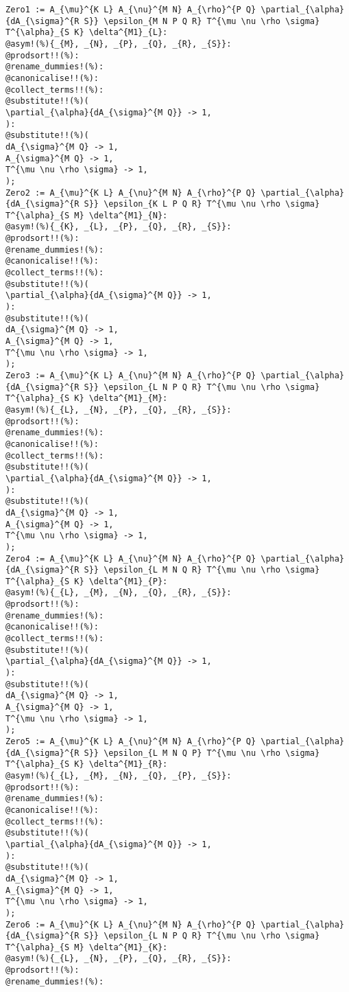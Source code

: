 \documentclass[11pt]{article}
\begin{document}
{\color[named]{Blue}\begin{verbatim}
Zero1 := A_{\mu}^{K L} A_{\nu}^{M N} A_{\rho}^{P Q} \partial_{\alpha}{dA_{\sigma}^{R S}} \epsilon_{M N P Q R} T^{\mu \nu \rho \sigma} T^{\alpha}_{S K} \delta^{M1}_{L}:
@asym!(%){_{M}, _{N}, _{P}, _{Q}, _{R}, _{S}}:
@prodsort!!(%):
@rename_dummies!(%):
@canonicalise!!(%):
@collect_terms!!(%):
@substitute!!(%)(
\partial_{\alpha}{dA_{\sigma}^{M Q}} -> 1,
):
@substitute!!(%)(
dA_{\sigma}^{M Q} -> 1,
A_{\sigma}^{M Q} -> 1,
T^{\mu \nu \rho \sigma} -> 1,
);
Zero2 := A_{\mu}^{K L} A_{\nu}^{M N} A_{\rho}^{P Q} \partial_{\alpha}{dA_{\sigma}^{R S}} \epsilon_{K L P Q R} T^{\mu \nu \rho \sigma} T^{\alpha}_{S M} \delta^{M1}_{N}:
@asym!(%){_{K}, _{L}, _{P}, _{Q}, _{R}, _{S}}:
@prodsort!!(%):
@rename_dummies!(%):
@canonicalise!!(%):
@collect_terms!!(%):
@substitute!!(%)(
\partial_{\alpha}{dA_{\sigma}^{M Q}} -> 1,
):
@substitute!!(%)(
dA_{\sigma}^{M Q} -> 1,
A_{\sigma}^{M Q} -> 1,
T^{\mu \nu \rho \sigma} -> 1,
);
Zero3 := A_{\mu}^{K L} A_{\nu}^{M N} A_{\rho}^{P Q} \partial_{\alpha}{dA_{\sigma}^{R S}} \epsilon_{L N P Q R} T^{\mu \nu \rho \sigma} T^{\alpha}_{S K} \delta^{M1}_{M}:
@asym!(%){_{L}, _{N}, _{P}, _{Q}, _{R}, _{S}}:
@prodsort!!(%):
@rename_dummies!(%):
@canonicalise!!(%):
@collect_terms!!(%):
@substitute!!(%)(
\partial_{\alpha}{dA_{\sigma}^{M Q}} -> 1,
):
@substitute!!(%)(
dA_{\sigma}^{M Q} -> 1,
A_{\sigma}^{M Q} -> 1,
T^{\mu \nu \rho \sigma} -> 1,
);
Zero4 := A_{\mu}^{K L} A_{\nu}^{M N} A_{\rho}^{P Q} \partial_{\alpha}{dA_{\sigma}^{R S}} \epsilon_{L M N Q R} T^{\mu \nu \rho \sigma} T^{\alpha}_{S K} \delta^{M1}_{P}:
@asym!(%){_{L}, _{M}, _{N}, _{Q}, _{R}, _{S}}:
@prodsort!!(%):
@rename_dummies!(%):
@canonicalise!!(%):
@collect_terms!!(%):
@substitute!!(%)(
\partial_{\alpha}{dA_{\sigma}^{M Q}} -> 1,
):
@substitute!!(%)(
dA_{\sigma}^{M Q} -> 1,
A_{\sigma}^{M Q} -> 1,
T^{\mu \nu \rho \sigma} -> 1,
);
Zero5 := A_{\mu}^{K L} A_{\nu}^{M N} A_{\rho}^{P Q} \partial_{\alpha}{dA_{\sigma}^{R S}} \epsilon_{L M N Q P} T^{\mu \nu \rho \sigma} T^{\alpha}_{S K} \delta^{M1}_{R}:
@asym!(%){_{L}, _{M}, _{N}, _{Q}, _{P}, _{S}}:
@prodsort!!(%):
@rename_dummies!(%):
@canonicalise!!(%):
@collect_terms!!(%):
@substitute!!(%)(
\partial_{\alpha}{dA_{\sigma}^{M Q}} -> 1,
):
@substitute!!(%)(
dA_{\sigma}^{M Q} -> 1,
A_{\sigma}^{M Q} -> 1,
T^{\mu \nu \rho \sigma} -> 1,
);
Zero6 := A_{\mu}^{K L} A_{\nu}^{M N} A_{\rho}^{P Q} \partial_{\alpha}{dA_{\sigma}^{R S}} \epsilon_{L N P Q R} T^{\mu \nu \rho \sigma} T^{\alpha}_{S M} \delta^{M1}_{K}:
@asym!(%){_{L}, _{N}, _{P}, _{Q}, _{R}, _{S}}:
@prodsort!!(%):
@rename_dummies!(%):

\end{verbatim}}
\end{document}
